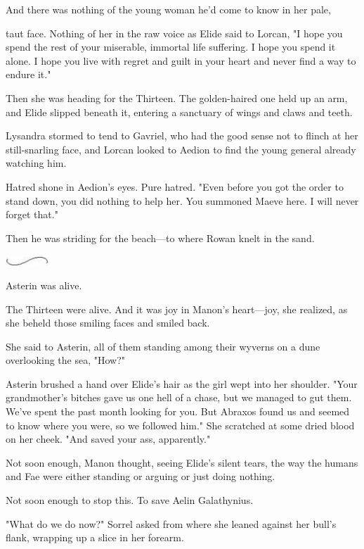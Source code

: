 And there was nothing of the young woman he'd come to know in her pale,

taut face.
Nothing of her in the raw voice as Elide said to Lorcan, "I hope you spend the rest of your miserable, immortal life suffering.
I hope you spend it alone.
I hope you live with regret and guilt in your heart and never find a way to endure it."

Then she was heading for the Thirteen.
The golden-haired one held up an arm, and Elide slipped beneath it, entering a sanctuary of wings and claws and teeth.

Lysandra stormed to tend to Gavriel, who had the good sense not to flinch at her still-snarling face, and Lorcan looked to Aedion to find the young general already watching him.

Hatred shone in Aedion's eyes.
Pure hatred.
"Even before you got the order to stand down, you did nothing to help her.
You summoned Maeve here.
I will never forget that."

Then he was striding for the beach---to where Rowan knelt in the sand.

\begin{center}
	\includegraphics[width=0.65in,height=0.13in]{images/seperator}
\end{center}

Asterin was alive.

The Thirteen were alive.
And it was joy in Manon's heart---joy, she realized, as she beheld those smiling faces and smiled back.

She said to Asterin, all of them standing among their wyverns on a dune overlooking the sea, "How?"

Asterin brushed a hand over Elide's hair as the girl wept into her shoulder.
"Your grandmother's bitches gave us one hell of a chase, but we managed to gut them.
We've spent the past month looking for you.
But Abraxos found us and seemed to know where you were, so we followed him."
She scratched at some dried blood on her cheek.
"And saved your ass, apparently."

Not soon enough, Manon thought, seeing Elide's silent tears, the way the humans and Fae were either standing or arguing or just doing nothing.

Not soon enough to stop this.
To save Aelin Galathynius.

"What do we do now?"
Sorrel asked from where she leaned against her bull's flank, wrapping up a slice in her forearm.

